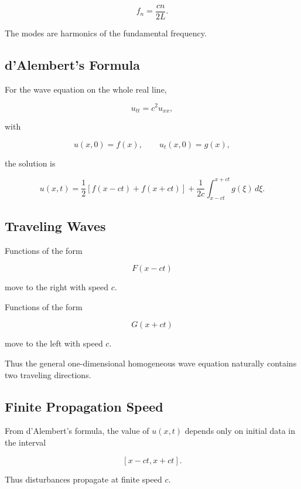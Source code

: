 \[
\boxed{
f_n
=
\frac{
cn
}{
2L
}.
}
\]

The modes are harmonics of the fundamental frequency.

\subsection{d'Alembert's Formula}
\label{subsec:dalembert-formula}

For the wave equation on the whole real line,

\[
u_{tt}
=
c^2u_{xx},
\]

with

\[
u(x,0)=f(x),
\qquad
u_t(x,0)=g(x),
\]

the solution is

\[
\boxed{
u(x,t)
=
\frac12
[
f(x-ct)+f(x+ct)
]
+
\frac1{2c}
\int_{x-ct}^{x+ct}
g(\xi)\,d\xi.
}
\]

\subsection{Traveling Waves}
\label{subsec:traveling-waves}

Functions of the form

\[
\boxed{
F(x-ct)
}
\]

move to the right with speed \(c\).

Functions of the form

\[
\boxed{
G(x+ct)
}
\]

move to the left with speed \(c\).

Thus the general one-dimensional homogeneous wave equation naturally
contains two traveling directions.

\subsection{Finite Propagation Speed}
\label{subsec:finite-propagation-speed}

From d'Alembert's formula, the value of \(u(x,t)\) depends only on initial
data in the interval

\[
\boxed{
[x-ct,x+ct].
}
\]

Thus disturbances propagate at finite speed \(c\).

